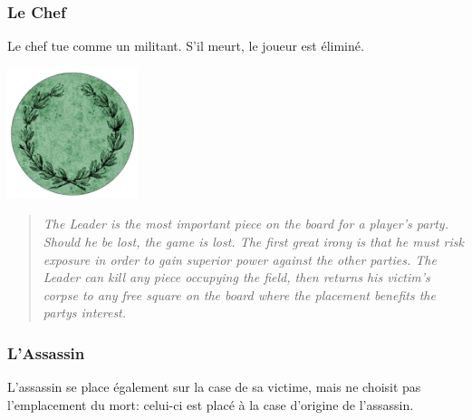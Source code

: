 \documentclass{article}
\begin{document}
\subsubsection{Le Chef}
Le chef tue comme un militant. S'il meurt, le joueur est éliminé.

\vspace{10pt} %
\noindent %
\begin{minipage}{0.3\textwidth} %
\includegraphics[width=1.5in,height=1.5in]{media/image13.png}
\end{minipage}%
\hfill %
\begin{minipage}{0.75\textwidth} %

\begin{quote}


\textit{The Leader is the most important piece on the board for a player's
party. Should he be lost, the game is lost. The first great irony is
that he must risk exposure in order to gain superior power against the
other parties.
The Leader can kill any piece occupying the field, then returns his
victim's corpse to any free square on the board where the
placement benefits the party\textquotesingle s interest.
}
\end{quote}
\end{minipage}
\vspace{20pt} %


\newpage


\subsubsection{L'Assassin}
L'assassin se place également sur la case de sa victime, mais ne choisit pas l'emplacement du mort: celui-ci est placé à la case d'origine de l'assassin.
\end{document}
